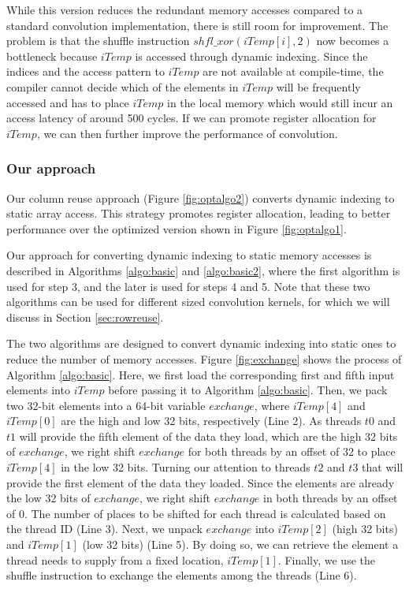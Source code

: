 While this version reduces the redundant memory accesses compared to a standard convolution implementation, there is still room for
improvement. The problem is that the shuffle instruction $shfl\_xor(iTemp[i],2)$ now becomes a bottleneck because $iTemp$ is accessed
through dynamic indexing. Since the indices and the access pattern to $iTemp$ are not available at compile-time, the compiler cannot decide
which of the elements in $iTemp$ will be frequently accessed and has to place $iTemp$ in the local memory which would still incur an access
latency of around 500 cycles. If we can promote register allocation for $iTemp$, we can then further improve the performance of
convolution.


\subsubsection{Our approach}
Our column reuse approach (Figure \ref {fig:optalgo2}) converts dynamic indexing to static array access. This strategy promotes register
allocation, leading to better performance over the optimized version shown in Figure \ref{fig:optalgo1}.

Our approach for converting dynamic indexing to static memory accesses is described in Algorithms \ref{algo:basic} and \ref{algo:basic2},
where the first algorithm is used for step 3, and the later is used for steps 4 and 5. Note that these two algorithms can be used for
different sized convolution kernels, for which we will discuss in Section \ref {sec:rowreuse}.

The two algorithms are designed to convert dynamic indexing into static ones to reduce the number of memory accesses. Figure
\ref{fig:exchange} shows the process of Algorithm \ref{algo:basic}. Here, we first load the corresponding first and fifth input elements
into $iTemp$ before passing it to Algorithm \ref{algo:basic}. Then, we pack two 32-bit elements into a 64-bit variable $exchange$, where
$iTemp[4]$ and $iTemp[0]$ are the high and low 32 bits, respectively (Line 2).  As threads $t0$ and $t1$ will provide the fifth element of
the data they load, which are the high 32 bits of $exchange$, we right shift $exchange$ for both threads by an offset of 32 to place
$iTemp[4]$ in the low 32 bits. Turning our attention to threads $t2$ and $t3$ that will provide the first element of the data they loaded.
Since the elements are already the low 32 bits of $exchange$, we right shift $exchange$ in both threads by an offset of 0. The number of
places to be shifted for each thread is calculated based on the thread ID (Line 3). Next, we unpack $exchange$ into $iTemp[2]$ (high 32
bits) and $iTemp[1]$ (low 32 bits) (Line 5). By doing so, we can retrieve the element a thread needs to supply from a fixed location,
$iTemp[1]$. Finally, we use the shuffle instruction to exchange the elements among the threads (Line 6).


